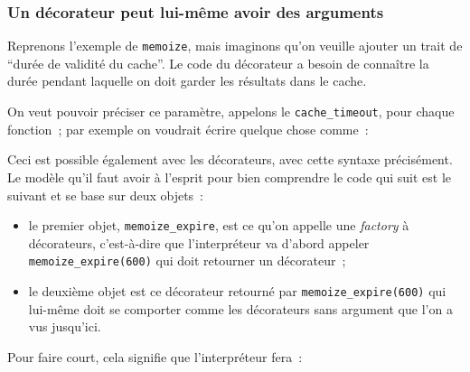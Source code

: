     \hypertarget{un-duxe9corateur-peut-lui-muxeame-avoir-des-arguments}{%
\subsubsection{Un décorateur peut lui-même avoir des
arguments}\label{un-duxe9corateur-peut-lui-muxeame-avoir-des-arguments}}

    Reprenons l'exemple de \texttt{memoize}, mais imaginons qu'on veuille
ajouter un trait de ``durée de validité du cache''. Le code du
décorateur a besoin de connaître la durée pendant laquelle on doit
garder les résultats dans le cache.

On veut pouvoir préciser ce paramètre, appelons le
\texttt{cache\_timeout}, pour chaque fonction~; par exemple on voudrait
écrire quelque chose comme~:

\begin{Shaded}
\begin{Highlighting}[]
\NormalTok{(}\NormalTok{)}

\NormalTok{(}\OperatorTok{*}\NormalTok{)}
\end{Highlighting}
\end{Shaded}

    Ceci est possible également avec les décorateurs, avec cette syntaxe
précisément. Le modèle qu'il faut avoir à l'esprit pour bien comprendre
le code qui suit est le suivant et se base sur deux objets~:

\begin{itemize}
\tightlist
\item
  le premier objet, \texttt{memoize\_expire}, est ce qu'on appelle une
  \emph{factory} à décorateurs, c'est-à-dire que l'interpréteur va
  d'abord appeler \texttt{memoize\_expire(600)} qui doit retourner un
  décorateur~;
\item
  le deuxième objet est ce décorateur retourné par
  \texttt{memoize\_expire(600)} qui lui-même doit se comporter comme les
  décorateurs sans argument que l'on a vus jusqu'ici.
\end{itemize}

Pour faire court, cela signifie que l'interpréteur fera~:

\begin{Shaded}
\begin{Highlighting}[]
\OperatorTok{=}
\end{Highlighting}
\end{Shaded}

